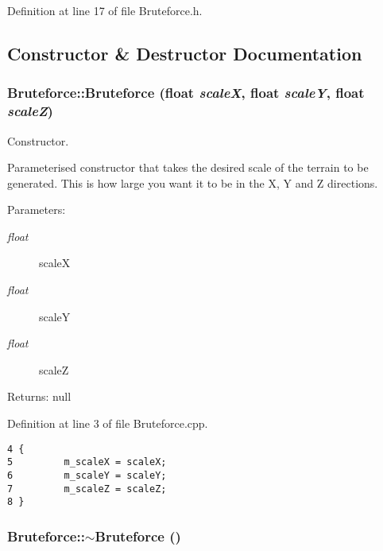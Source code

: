 Definition at line 17 of file Bruteforce.h.

\subsection{Constructor \& Destructor Documentation}
\hypertarget{class_bruteforce_a34632542f0b77ed5f6faad3515130db}{
\subsubsection[Bruteforce]{\setlength{\rightskip}{0pt plus 5cm}Bruteforce::Bruteforce (float {\em scaleX}, \/  float {\em scaleY}, \/  float {\em scaleZ})}}
\label{class_bruteforce_a34632542f0b77ed5f6faad3515130db}


Constructor. 

Parameterised constructor that takes the desired scale of the terrain to be generated. This is how large you want it to be in the X, Y and Z directions.

\begin{Desc}
\item[Parameters:]
\begin{description}
\item[{\em float}]scaleX \item[{\em float}]scaleY \item[{\em float}]scaleZ \end{description}
\end{Desc}
\begin{Desc}
\item[Returns:]null \end{Desc}


Definition at line 3 of file Bruteforce.cpp.

\begin{Code}\begin{verbatim}4 {
5         m_scaleX = scaleX;
6         m_scaleY = scaleY;
7         m_scaleZ = scaleZ;
8 }
\end{verbatim}
\end{Code}


\hypertarget{class_bruteforce_61f92c7ada314e8e785231e86229af1a}{
\subsubsection[$\sim$Bruteforce]{\setlength{\rightskip}{0pt plus 5cm}Bruteforce::$\sim$Bruteforce ()}}
\label{class_bruteforce_61f92c7ada314e8e785231e86229af1a}


